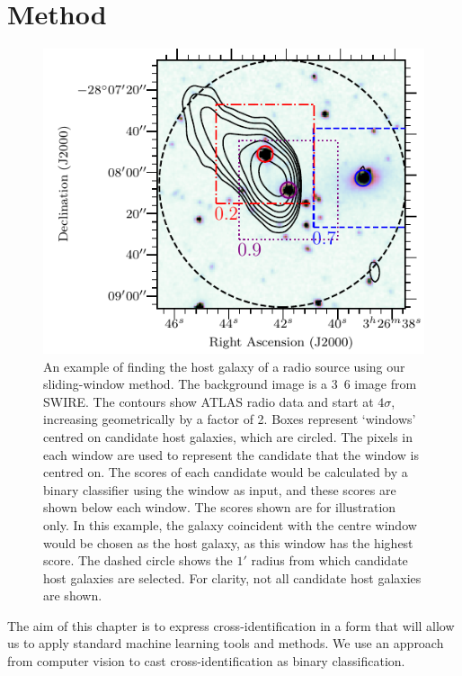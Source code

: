   \section{Method}\label{sec:atlas-xid-method}
    \begin{figure}
      \centering
      \includegraphics[width=0.6\columnwidth]{atlas-images/figure_example_of_method.pdf}
      \caption[An example of {finding} the host galaxy of a radio source using
        our sliding-window method.]{An example of {finding} the host galaxy of a radio source using
        our sliding-window method. The background image is a \unit{3.6}{\micro\meter} image from SWIRE. The contours show ATLAS radio data and start at $4\sigma$, increasing geometrically by a factor of 2. Boxes represent `windows'
        centred on {candidate host galaxies, which are circled. The pixels in each window are used to represent the candidate that the window is centred
        on. The scores of each candidate would be calculated by a binary classifier using the window as input,
        and these scores are shown below each window}. The scores
        shown are for illustration only. In this example,
        {the galaxy coincident with the centre window would be chosen as the host galaxy, as this
        window has the highest score.
        The dashed circle
        shows the $1'$ radius from which candidate host galaxies are selected. For clarity, not all candidate host galaxies are shown.}}
      \label{fig:windows}
    \end{figure}

  {The aim of this chapter is to express cross-identification in a form that
  will allow us to apply standard machine learning tools and methods. We use an approach from computer vision
  to cast cross-identification as binary classification.}

